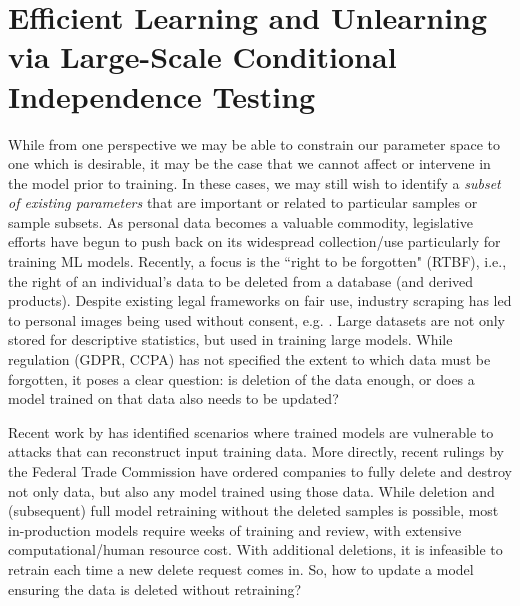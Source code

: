 \chapter{Efficient Learning and Unlearning via Large-Scale Conditional Independence Testing} \label{chap:lcodec} 

While from one perspective we may be able to constrain our parameter space to one which is desirable,
it may be the case that we cannot
affect or intervene in the model prior to training.
In these cases, 
we may still wish to identify a \textit{subset of existing parameters} that are important or related to particular samples or sample subsets.
As personal data becomes a valuable commodity, legislative efforts have begun to push back on its widespread collection/use particularly for training ML models. Recently, a focus is the ``right to be forgotten" (RTBF), i.e., the right of an individual's data to be deleted from a database (and derived products).
Despite existing legal frameworks on fair use, industry scraping has led to personal images being used without consent, e.g. \citep{Exposing}.
Large datasets are not only stored for descriptive statistics, but used in training large models.
While regulation (GDPR, CCPA) has not specified the extent to which data must be forgotten, it poses a clear question: is  deletion of the data enough, or does a model trained on that data also needs to be updated?

Recent work by \citep{carlini2019secret,carlini2020attack} has identified scenarios where trained models are vulnerable to attacks that can reconstruct input training data. More directly, recent rulings by the Federal Trade Commission \cite{ftc,ftc2} have ordered companies to fully delete and destroy not only data, but also any model trained using those data.
While deletion and (subsequent) full model retraining without the deleted samples is possible, most in-production models require weeks of 
training and review, with extensive computational/human resource cost. With additional deletions, it is infeasible to retrain each time a new delete request comes in. 
So, how to update a model ensuring the data is deleted without retraining?

